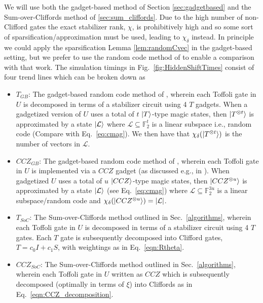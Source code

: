 We will use both the gadget-based method of Section \ref{sec:gadgetbased} and the Sum-over-Cliffords method of \ref{sec:sum_cliffords}. Due to the high number of non-Clifford gates the exact stabilizer rank, $\chi$, is prohibitively high and so some sort of sparsification/approximation must be used, leading to $\chi_\delta$ instead. In principle we could apply the sparsification Lemma \ref{lem:randomCvec} in the gadget-based setting, but we prefer to use the random code method of \cite{bravyi2016improved} to enable a comparison with that work. The simulation timings in Fig.~\ref{fig:HiddenShiftTimes} consist of four trend lines which can be broken down as
\begin{itemize}
\item $T_{GB}$: The gadget-based random code method of \cite{bravyi2016improved}, wherein each Toffoli gate in $U$ is decomposed in terms of a stabilizer circuit using 4 $T$ gadgets. When a gadgetized version of $U$ uses a total of $t$  $|T\rangle$-type magic states, then $|T^{\otimes t}\rangle$ is approximated by a state $|\mathcal{L}\rangle$ where $\mathcal{L} \subseteq \mathbb{F}_2^t$ is a linear subspace i.e., random code (Compare with Eq.~\eqref{eq:cmag}). We then have that $\chi_\delta(|T^{\otimes t}\rangle)$ is the number of vectors in $\mathcal{L}$.
\item $CCZ_{GB}$: The gadget-based random code method of \cite{bravyi2016improved}, wherein each Toffoli gate in $U$ is implemented via a $CCZ$ gadget (as discussed e.g., in \cite{Howard17robustness}). When gadgetized $U$ uses a total of $u$  $|CCZ\rangle$-type magic states, then $|CCZ^{\otimes u}\rangle$ is approximated by a state $|\mathcal{L}\rangle$ (see Eq.~\eqref{eq:cmag}) where $\mathcal{L} \subseteq \mathbb{F}_2^{3u}$ is a linear subspace/random code and $\chi_\delta(|CCZ^{\otimes u}\rangle)=|\mathcal{L}|$.
\item $T_{SoC}$: The Sum-over-Cliffords method outlined in Sec.~\ref{algorithms}, wherein each Toffoli gate in $U$ is decomposed in terms of a stabilizer circuit using 4 $T$ gates. Each $T$ gate is subsequently decomposed into Clifford gates, $T=c_0I+c_1S$, with weightings as in Eq.~\eqref{eqn:Rtheta}.
\item $CCZ_{SoC}$: The Sum-over-Cliffords method outlined in Sec.~\ref{algorithms}, wherein each Toffoli gate in $U$ written as $CCZ$ which is subsequently decomposed (optimally in terms of $\xi$) into Cliffords as in Eq.~\eqref{eqn:CCZ_decomposition}.
\end{itemize}



